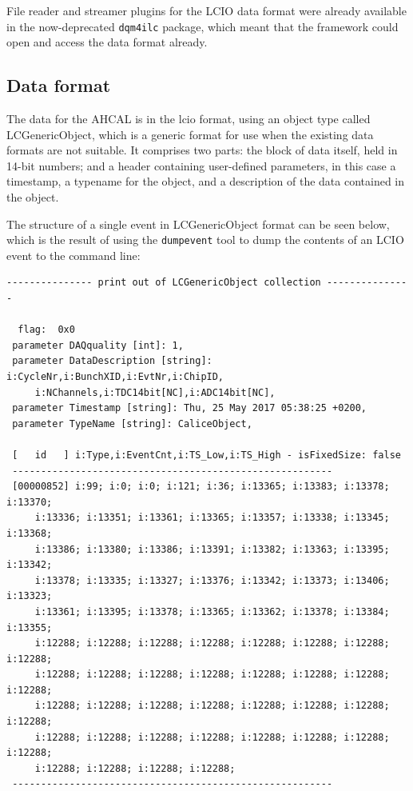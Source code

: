 File reader and streamer plugins for the LCIO data format were already available in the now-deprecated \texttt{dqm4ilc} package, which meant that the framework could open and access the data format already.

\subsection{Data format}
The data for the AHCAL is in the \acrfull{lcio} format, using an object type called LCGenericObject, which is a generic format for use when the existing data formats are not suitable. It comprises two parts: the block of data itself, held in 14-bit numbers; and a header containing user-defined parameters, in this case a timestamp, a typename for the object, and a description of the data contained in the object.

The structure of a single event in LCGenericObject format can be seen below, which is the result of using the \texttt{dumpevent} tool to dump the contents of an LCIO event to the command line:

\begin{verbatim}
--------------- print out of LCGenericObject collection --------------- 

  flag:  0x0
 parameter DAQquality [int]: 1, 
 parameter DataDescription [string]: i:CycleNr,i:BunchXID,i:EvtNr,i:ChipID,
     i:NChannels,i:TDC14bit[NC],i:ADC14bit[NC], 
 parameter Timestamp [string]: Thu, 25 May 2017 05:38:25 +0200, 
 parameter TypeName [string]: CaliceObject, 

 [   id   ] i:Type,i:EventCnt,i:TS_Low,i:TS_High - isFixedSize: false
 --------------------------------------------------------
 [00000852] i:99; i:0; i:0; i:121; i:36; i:13365; i:13383; i:13378; i:13370;
     i:13336; i:13351; i:13361; i:13365; i:13357; i:13338; i:13345; i:13368;
     i:13386; i:13380; i:13386; i:13391; i:13382; i:13363; i:13395; i:13342;
     i:13378; i:13335; i:13327; i:13376; i:13342; i:13373; i:13406; i:13323;
     i:13361; i:13395; i:13378; i:13365; i:13362; i:13378; i:13384; i:13355;
     i:12288; i:12288; i:12288; i:12288; i:12288; i:12288; i:12288; i:12288;
     i:12288; i:12288; i:12288; i:12288; i:12288; i:12288; i:12288; i:12288;
     i:12288; i:12288; i:12288; i:12288; i:12288; i:12288; i:12288; i:12288;
     i:12288; i:12288; i:12288; i:12288; i:12288; i:12288; i:12288; i:12288;
     i:12288; i:12288; i:12288; i:12288;
 --------------------------------------------------------
\end{verbatim}

